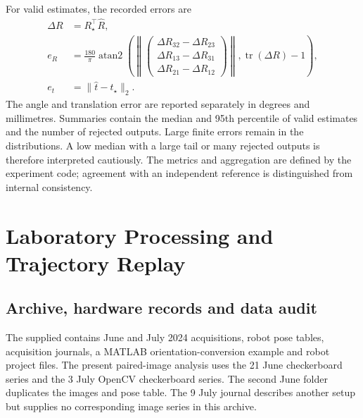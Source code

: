 \documentclass[12pt,a4paper]{article}
\newcommand{\code}[1]{\texttt{\detokenize{#1}}}
\begin{document}
For valid estimates, the recorded errors are
\begin{align}
\Delta R&=R_\star^\top\widehat R,\\
e_R&=\frac{180}{\pi}\operatorname{atan2}\!\left(
\left\|\begin{pmatrix}\Delta R_{32}-\Delta R_{23}\\\Delta R_{13}-\Delta R_{31}\\\Delta R_{21}-\Delta R_{12}\end{pmatrix}\right\|,
\operatorname{tr}(\Delta R)-1\right),\label{eq:rotation-error}\\
e_t&=\|\widehat t-t_\star\|_2.\label{eq:translation-error}
\end{align}
The angle and translation error are reported separately in degrees and millimetres. Summaries contain the median and 95th percentile of valid estimates and the number of rejected outputs. Large finite errors remain in the distributions. A low median with a large tail or many rejected outputs is therefore interpreted cautiously. The metrics and aggregation are defined by the experiment code; agreement with an independent reference is distinguished from internal consistency. \cite{experimentcode,eauncertainty}

\clearpage
\section{Laboratory Processing and Trajectory Replay}\label{sec:laboratory}
\subsection{Archive, hardware records and data audit}
The supplied \code{Data4Osinchuk.zip} contains June and July 2024 acquisitions, robot pose tables, acquisition journals, a MATLAB orientation-conversion example and robot project files. The present paired-image analysis uses the 21 June checkerboard series and the 3 July OpenCV checkerboard series. The second June folder duplicates the images and pose table. The 9 July journal describes another setup but supplies no corresponding image series in this archive. \cite{laboratoryarchive}
\end{document}
